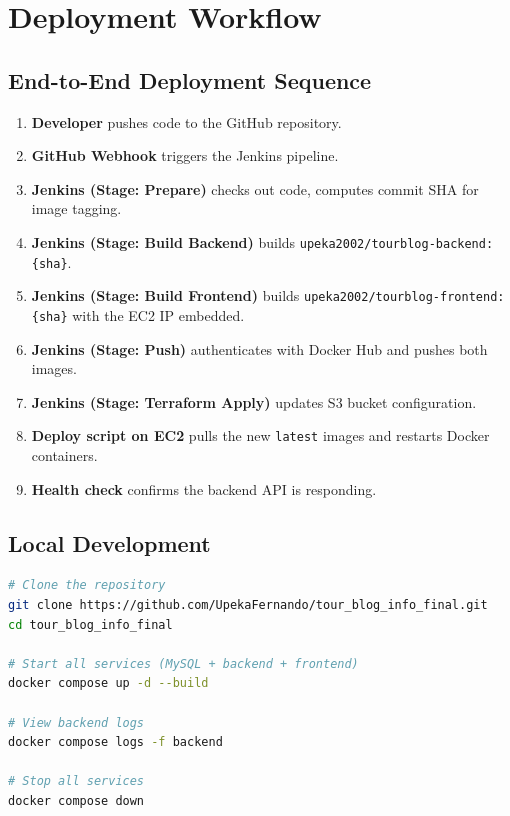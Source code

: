 \documentclass[12pt,a4paper]{report}
\begin{document}
\chapter{Deployment Workflow}

\section{End-to-End Deployment Sequence}

\begin{enumerate}[leftmargin=2em]
  \item \textbf{Developer} pushes code to the GitHub repository.
  \item \textbf{GitHub Webhook} triggers the Jenkins pipeline.
  \item \textbf{Jenkins (Stage: Prepare)} checks out code, computes commit SHA for image tagging.
  \item \textbf{Jenkins (Stage: Build Backend)} builds \texttt{upeka2002/tourblog-backend:\{sha\}}.
  \item \textbf{Jenkins (Stage: Build Frontend)} builds \texttt{upeka2002/tourblog-frontend:\{sha\}} with the EC2 IP embedded.
  \item \textbf{Jenkins (Stage: Push)} authenticates with Docker Hub and pushes both images.
  \item \textbf{Jenkins (Stage: Terraform Apply)} updates S3 bucket configuration.
  \item \textbf{Deploy script on EC2} pulls the new \texttt{latest} images and restarts Docker containers.
  \item \textbf{Health check} confirms the backend API is responding.
\end{enumerate}

\section{Local Development}

\begin{lstlisting}[language=bash, caption={Starting the application locally}]
# Clone the repository
git clone https://github.com/UpekaFernando/tour_blog_info_final.git
cd tour_blog_info_final

# Start all services (MySQL + backend + frontend)
docker compose up -d --build

# View backend logs
docker compose logs -f backend

# Stop all services
docker compose down
\end{lstlisting}
\end{document}
